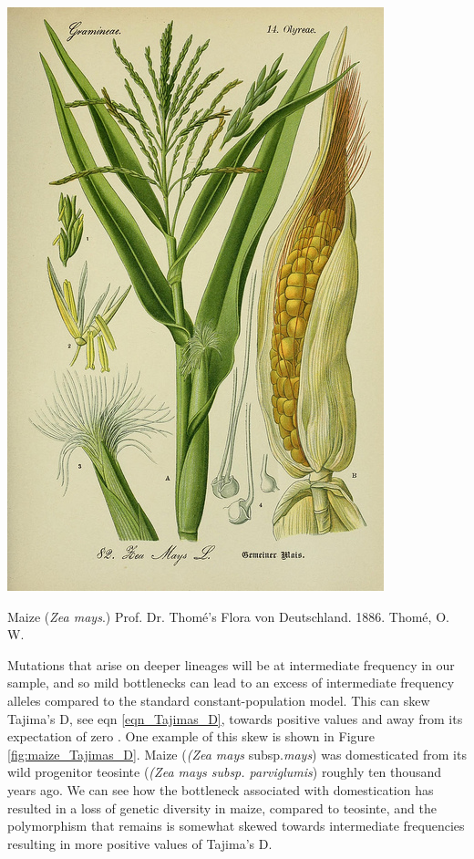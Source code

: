 \begin{marginfigure}[4cm]
\begin{center}
  \includegraphics[width = \textwidth]{illustration_images/Genetic_drift/maize/7845339168_66aa3d8ccc_z.jpg}
\end{center}
\caption{Maize ({\it Zea mays}.) Prof. Dr. Thomé's Flora von
  Deutschland. 1886. Thomé, O. W. } \label{fig:maize}  %
\end{marginfigure}  %

Mutations that arise on deeper lineages will be at intermediate frequency in our sample, and so mild bottlenecks
can lead to an excess of intermediate frequency alleles compared to
the standard constant-population model. This can skew 
Tajima's D, see eqn \ref{eqn_Tajimas_D}, towards positive values and away from its expectation of
zero . One example of this skew is shown in Figure
\ref{fig:maize_Tajimas_D}. Maize ({\it (Zea mays} subsp.{\it mays}) was domesticated from its wild progenitor teosinte ({\it (Zea mays
subsp. parviglumis}) roughly ten thousand years ago. We can see how the
 bottleneck associated with domestication has resulted in a loss of genetic diversity in maize, compared to teosinte, and the polymorphism that remains is somewhat skewed towards intermediate frequencies resulting in more positive values of Tajima's D.

